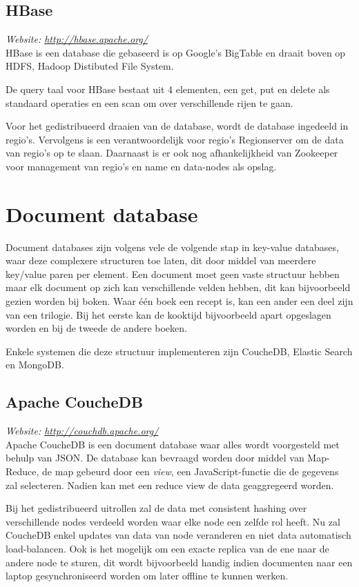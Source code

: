 \subsection{HBase}
\textit{Website: \url{http://hbase.apache.org/}}\\
HBase is een database die gebaseerd is op Google's BigTable en draait boven op HDFS, Hadoop Distibuted File System.

De query taal voor HBase bestaat uit 4 elementen, een get, put en delete als standaard operaties en een scan om over verschillende rijen te gaan. 

Voor het gedistribueerd draaien van de database, wordt de database ingedeeld in regio's. Vervolgens is een verantwoordelijk voor regio's  Regionserver om de data van regio's op te slaan. Daarnaast is er ook nog afhankelijkheid van Zookeeper voor management van regio's en name en data-nodes als opslag.  

\section{Document database}
Document databases zijn volgens vele de volgende stap in key-value databases, waar deze complexere structuren toe laten, dit door middel van meerdere key/value paren per element. 
Een document moet geen vaste structuur hebben maar elk document op zich kan verschillende velden hebben, dit kan bijvoorbeeld gezien worden bij boken. Waar één boek een recept is, kan een ander een deel zijn van een trilogie. Bij het eerste kan de kooktijd bijvoorbeeld apart opgeslagen worden en bij de tweede de andere boeken. 

Enkele systemen die deze structuur implementeren zijn CoucheDB, Elastic Search en MongoDB. 

\subsection{Apache CoucheDB}
\textit{Website: \url{http://couchdb.apache.org/}}\\
Apache CoucheDB is een document database waar alles wordt voorgesteld met behulp van JSON. De database kan bevraagd worden door middel van Map-Reduce, de map gebeurd door een \textit{view}, een JavaScript-functie die de gegevens zal selecteren. Nadien kan met een reduce view de data geaggregeerd worden. 

Bij het gedistribueerd uitrollen zal de data met consistent hashing over verschillende nodes verdeeld worden waar elke node een zelfde rol heeft. Nu zal CoucheDB enkel updates van data van node veranderen en niet data automatisch load-balancen. Ook is het mogelijk om een exacte replica van de ene naar de andere node te sturen, dit wordt bijvoorbeeld handig indien documenten naar een laptop gesynchroniseerd worden om later offline te kunnen werken.

